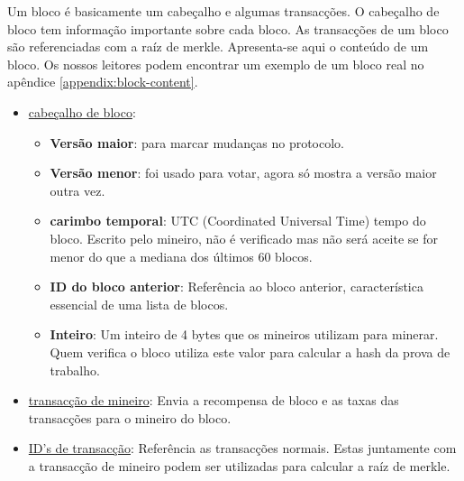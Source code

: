 Um bloco é basicamente um cabeçalho e algumas transacções. O cabeçalho de bloco tem informação importante sobre cada bloco. As transacções de um bloco são referenciadas com a raíz de merkle. Apresenta-se aqui o conteúdo de um bloco. Os nossos leitores podem encontrar um exemplo de um bloco real no apêndice \ref{appendix:block-content}.  

\begin{itemize}
\item \underline{cabeçalho de bloco}:
    \begin{itemize}
    \item \textbf{Versão maior}: para marcar mudanças no protocolo.
        \item \textbf{Versão menor}: foi usado para votar, agora só mostra a versão maior outra vez.
        \item \textbf{carimbo temporal}: UTC (Coordinated Universal Time) tempo do bloco. Escrito pelo mineiro, não é verificado mas não será aceite se for menor do que a mediana dos últimos 60 blocos.%
        \item \textbf{ID do bloco anterior}: Referência ao bloco anterior, característica essencial de uma lista de blocos.
        \item \textbf{Inteiro}: Um inteiro de 4 bytes que os mineiros utilizam para minerar. Quem verifica o bloco utiliza este valor para calcular a hash da prova de trabalho. 
    \end{itemize}
    \item \underline{transacção de mineiro}: Envia a recompensa de bloco e as taxas das transacções para o mineiro do bloco.
    \item \underline{ID's de transacção}: Referência as transacções normais. Estas juntamente com a transacção de mineiro podem ser utilizadas para calcular a raíz de merkle. 

\end{itemize}
\vspace{.05cm}

